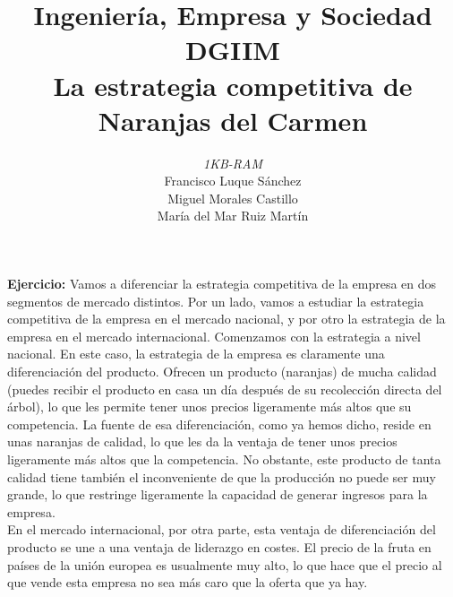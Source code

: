 \documentclass[11pt]{article}
\theoremstyle{plain}
\theoremstyle{definition}
\begin{document}
\title{Ingeniería, Empresa y Sociedad \\
  DGIIM \\
  \large La estrategia competitiva de Naranjas del Carmen}
\author{\textit{1KB-RAM}\\
  Francisco Luque Sánchez\\
  Miguel Morales Castillo\\
  María del Mar Ruiz Martín}

\maketitle

\textbf{Ejercicio:} Vamos a diferenciar la estrategia competitiva de
la empresa en dos segmentos de mercado distintos. Por un lado, vamos
a estudiar la estrategia competitiva de la empresa en el mercado
nacional, y por otro la estrategia de la empresa en el mercado
internacional. Comenzamos con la estrategia a nivel nacional. En este
caso, la estrategia de la empresa es claramente una diferenciación del
producto. Ofrecen un producto (naranjas) de mucha calidad (puedes
recibir el producto en casa un día después de su recolección directa
del árbol), lo que les permite tener unos precios ligeramente más
altos que su competencia. La fuente de esa diferenciación, como ya
hemos dicho, reside en unas naranjas de calidad, lo que les da la
ventaja de tener unos precios ligeramente más altos que la
competencia.  No obstante, este producto de tanta calidad tiene
también el inconveniente de que la producción no puede ser muy grande,
lo que restringe ligeramente la capacidad de generar ingresos para
la empresa.\\

En el mercado internacional, por otra parte, esta ventaja de
diferenciación del producto se une a una ventaja de liderazgo en
costes. El precio de la fruta en países de la unión europea es
usualmente muy alto, lo que hace que el precio al que vende esta
empresa no sea más caro que la oferta que ya hay.\\
\end{document}

